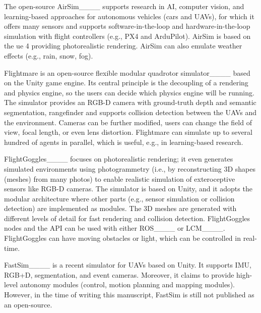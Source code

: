   The open-source AirSim____ supports research in AI, computer vision, and learning-based approaches for autonomous vehicles (cars and UAVs), for which it offers many sensors  
  and supports software-in-the-loop and hardware-in-the-loop simulation
  with flight controllers (e.g., PX4 and ArduPilot).
  AirSim is based on the \ac{ue} 4 providing photorealistic rendering.
  AirSim can also emulate weather effects (e.g., rain, snow, fog).

  Flightmare is an open-source flexible modular quadrotor simulator____ based on the Unity game engine.
  Its central principle is the decoupling of a rendering and physics engine, 
  so the users can decide which physics engine will be running.
  The simulator provides an RGB-D camera with ground-truth depth and semantic segmentation, rangefinder and supports collision detection between the UAVs and the environment.
  Cameras can be further modified, users can change the field of view, focal length, or even lens distortion.
  Flightmare can simulate up to several hundred of agents in parallel, which is useful, e.g., in learning-based research.

  FlightGoggles____ focuses on photorealistic
  rendering; it even generates simulated environments 
  using photogrammetry (i.e., by reconstructing 3D shapes (meshes) from many photos) to enable realistic simulation of exteroceptive sensors like RGB-D cameras.
  The simulator is based on Unity, and it adopts the modular architecture where other parts (e.g., sensor simulation or collision detection) are implemented as modules.
  The 3D meshes are generated with different levels of detail for fast rendering and collision detection.
  FlightGoggles nodes and the API can be used with either ROS____ or LCM____.
  FlightGoggles can have moving obstacles or light, which can be controlled in real-time.

  FastSim____ is a recent simulator for UAVs based on Unity.
  It supports IMU, RGB+D, segmentation, and event cameras.
  Moreover, it claims to provide high-level autonomy modules (control, motion planning and mapping modules).
  However, in the time of writing this manuscript, FastSim is still not published as an open-source.


